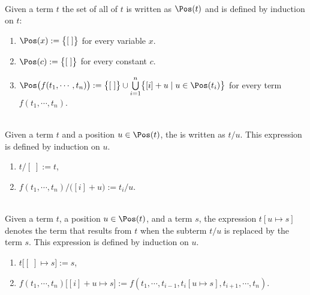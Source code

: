 \begin{Definition} \hspace*{\fill} \\
  Given a term $t$ the set of all  of $t$ is written as $\Pos(t)$ and is defined by
  induction on $t$:
  \begin{enumerate}
  \item $\Pos(x) := \bigl\{ [\;] \bigr\}$ \quad for every variable $x$.
  \item $\Pos(c) := \bigl\{ [\;] \bigr\}$ \quad for every constant $c$.
  \item $\Pos\bigl(f(t_1,\cdots,t_n)\bigr) := 
         \bigl\{ [\;] \bigr\} \cup \bigcup\limits_{i=1}^n \bigl\{ [i] + u \mid u \in \Pos(t_i) \bigr\}$ 
        \quad for every term $f(t_1,\cdots,t_n)$. \eoxs
  \end{enumerate}
\end{Definition}

\begin{Definition} \hspace*{\fill} \\
  Given a term $t$ and a position $u \in \Pos(t)$, the  is
  written as $t/u$.  This expression is defined by induction on $u$.
  \begin{enumerate}
  \item $t/[\;] := t$,
  \item $f(t_1,\cdots,t_n)/\bigl([i]+u\bigr) := t_i/u$.  \eoxs
  \end{enumerate}
\end{Definition}

\begin{Definition} \hspace*{\fill} \\
  Given a term $t$, a position $u \in \Pos(t)$, and a term $s$, the expression
  $t[u \mapsto s]$ denotes the term that results from $t$ when the subterm $t/u$ is replaced by the term 
  $s$.  This expression is defined by induction on $u$.
  \begin{enumerate}
  \item $t\bigl[ [\;] \mapsto s \bigr] := s$,
  \item $f(t_1,\cdots,t_n)\bigl[ [i]+u \mapsto s \bigr] := f(t_1, \cdots, t_{i-1},t_i[u \mapsto s], t_{i+1},\cdots, t_n)$.  
        \eoxs
  \end{enumerate}
\end{Definition}
  
